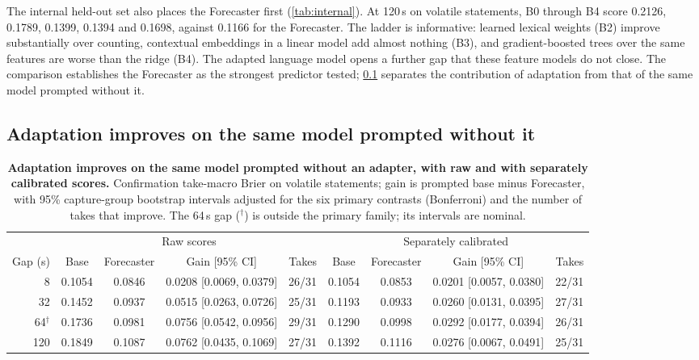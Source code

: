\documentclass[10pt]{article}
\begin{document}
The internal held-out set also places the Forecaster first (\cref{tab:internal}). At 120\,s on volatile statements, B0 through B4 score 0.2126, 0.1789, 0.1399, 0.1394 and 0.1698, against 0.1166 for the Forecaster. The ladder is informative: learned lexical weights (B2) improve substantially over counting, contextual embeddings in a linear model add almost nothing (B3), and gradient-boosted trees over the same features are worse than the ridge (B4). The adapted language model opens a further gap that these feature models do not close. The comparison establishes the Forecaster as the strongest predictor tested; \cref{sec:adaptation} separates the contribution of adaptation from that of the same model prompted without it.

\subsection{Adaptation improves on the same model prompted without it}
\label{sec:adaptation}

\begin{table}[t]
\centering
\caption{\textbf{Adaptation improves on the same model prompted without an adapter, with raw and with separately calibrated scores.} Confirmation take-macro Brier on volatile statements; gain is prompted base minus Forecaster, with 95\% capture-group bootstrap intervals adjusted for the six primary contrasts (Bonferroni) and the number of takes that improve. The 64\,s gap ($^{\dagger}$) is outside the primary family; its intervals are nominal.}
\label{tab:adapt}
\small
\setlength{\tabcolsep}{3.5pt}
\begin{tabular}{rcccrcccr}
\toprule
& \multicolumn{4}{c}{Raw scores} & \multicolumn{4}{c}{Separately calibrated} \\
\cmidrule(lr){2-5}\cmidrule(lr){6-9}
Gap (s) & Base & Forecaster & Gain [95\% CI] & Takes & Base & Forecaster & Gain [95\% CI] & Takes \\
\midrule
8 & 0.1054 & 0.0846 & 0.0208 [0.0069, 0.0379] & 26/31 & 0.1054 & 0.0853 & 0.0201 [0.0057, 0.0380] & 22/31 \\
32 & 0.1452 & 0.0937 & 0.0515 [0.0263, 0.0726] & 25/31 & 0.1193 & 0.0933 & 0.0260 [0.0131, 0.0395] & 27/31 \\
64$^{\dagger}$ & 0.1736 & 0.0981 & 0.0756 [0.0542, 0.0956] & 29/31 & 0.1290 & 0.0998 & 0.0292 [0.0177, 0.0394] & 26/31 \\
120 & 0.1849 & 0.1087 & 0.0762 [0.0435, 0.1069] & 27/31 & 0.1392 & 0.1116 & 0.0276 [0.0067, 0.0491] & 25/31 \\
\bottomrule
\end{tabular}
\end{table}
\end{document}
